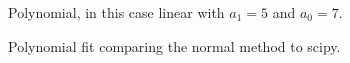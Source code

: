 \documentclass[twocolumn,11pt]{article}
\begin{document}
\begin{figure}[!h]
	\centering
	\noindent
      \caption{Polynomial, in this case linear with $a_1=5$ and $a_0=7$.}
\end{figure}

\begin{figure}[!h]
	\centering
	\noindent
      \caption{Polynomial fit comparing the normal method to scipy.}
\end{figure}
\end{document}
